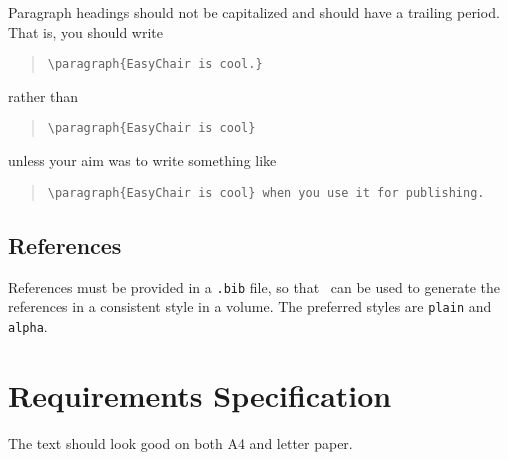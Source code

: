 \documentclass[a4paper]{easychair}
\begin{document}
Paragraph headings should not be capitalized and should have a
trailing period. That is, you should write

\begin{quote}
\verb|\paragraph{EasyChair is cool.}|
\end{quote}
rather than 

\begin{quote}
\verb|\paragraph{EasyChair is cool}|
\end{quote}
unless your aim was to write something like

\begin{quote}
\verb|\paragraph{EasyChair is cool} when you use it for publishing.| 
\end{quote}

\subsection{References}
\label{sect:references}

References must be provided in a {\tt .bib} file, so that \BibTeX\ can
be used to generate the references in a consistent style in a volume.
The preferred styles are {\tt plain} and {\tt alpha}.


%
%
%
%

\appendix
\section{Requirements Specification}
\label{sect:easychair-requirements}

The text should look good on both A4 and letter paper.


\end{document}
